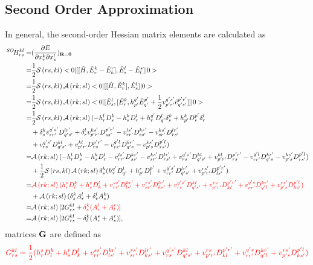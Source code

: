 \documentclass[a4paper,12pt,oneside]{book}
\newcommand{\red}[1]{{\color{red} #1}}
\newcommand{\Sop}[2]{{\cal S}\left(#1,#2\right)}
\newcommand{\ASop}[2]{{\cal A}\left(#1;#2\right)}
\newcommand{\pre}[1]{\,#1\!}
\begin{document}
\subsection{Second Order Approximation}
In general, the second-order Hessian matrix elements are calculated as
\begin{equation}
\begin{aligned}
  \pre{^{SO}}H_{rs}^{kl} =&  (\frac{\partial E}{\partial x_r^k\partial x_s^l})_{\bf{R = \bf{0}}}\\
  =& \frac{1}{2}\Sop{rs}{kl} <0|[[\hat{H},\hat{E}^k_r-\hat{E}^r_k],\hat{E}^l_s-\hat{E}^s_l]|0>\\
  =& \frac{1}{2}\Sop{rs}{kl} \ASop{rk}{sl} <0|[[\hat{H},\hat{E}^k_r], \hat{E}^l_s]|0>\\
  =& \frac{1}{2}\Sop{rs}{kl} \ASop{rk}{sl} <0|[\hat{E}^l_s,[\hat{E}^k_r, h^{q'}_{p'}\hat{E}^{p'}_{q'} + \frac{1}{2}v^{q's'}_{p'r'}\hat{e}^{p'r'}_{q's'}]]|0>\\
  =& \frac{1}{2}\Sop{rs}{kl} \ASop{rk}{sl} (-h^l_rD^k_s -h^k_sD^l_r + h^{q'}_rD^l_{q'}\delta^k_s + h^k_{p'}D^{p'}_s\delta^l_r\\
  &+\delta^k_sv^{q's'}_{rr'}D^{lr'}_{q's'} + \delta^l_r v^{ks'}_{p'r'}D^{p'r'}_{ss'}-v^{ls'}_{rr'}D^{kr'}_{ss'} - v^{ks'}_{sr'}D^{lr'}_{rs'}\\
  &+v^{q's'}_{rs}D^{kl}_{q's'} + v^{kl}_{p'r'}D^{p'r'}_{rs} - v^{q'l}_{rr'}D^{kr'}_{q's} - v^{ks'}_{p's}D^{p'l}_{rs'})\\
  =& \ASop{rk}{sl} (-h^l_rD^k_s - h^k_sD^l_r -v^{ls'}_{rr'}D^{kr'}_{ss'} - v^{ks'}_{sr'}D^{lr'}_{rs'} +v^{q's'}_{rs}D^{kl}_{q's'} + v^{kl}_{p'r'}D^{p'r'}_{rs} - v^{q'l}_{rr'}D^{kr'}_{q's} - v^{ks'}_{p's}D^{p'l}_{rs'} )\\
   &+ \frac{1}{2} \Sop{rs}{kl} \ASop{rk}{sl} \delta^k_s(h^{q'}_rD^l_{q'} + h^r_{p'}D^{p'}_l +v^{q's'}_{rr'} D^{lr'}_{q's'}+ v^{rs'}_{p'r'}D^{p'r'}_{ls'} ) \\
  =&\red{ \ASop{rk}{sl} (h^s_rD^k_l + h^r_s D^l_k + v^{ss'}_{rr'}D^{kr'}_{ls'} + v^{rs'}_{sr'}D^{lr'}_{ks'} + v^{q's'}_{rs}D^{kl}_{q's'} + v^{rs}_{p'r'}D^{p'r'}_{kl} + v^{q's}_{rr'}D^{kr'}_{q'l}+  v^{rs'}_{p's}D^{p'l}_{ks'}) }\\
   &+ \ASop{rk}{sl}(\delta^k_sA^l_r+\delta^l_rA^k_s)\\
  =& \ASop{rk}{sl} [2G^{kl}_{rs}+ \red{\delta^k_s(A^l_r+A^r_l)}]\\
  =& \ASop{rk}{sl} [2G^{kl}_{rs}-\delta^k_l(A_r^s+A_s^r)],\\
\end{aligned}
\end{equation}
matrices $\bf{G}$ are defined as
\begin{equation}
  \red{G^{kl}_{rs} = \frac{1}{2} (h^s_rD^k_l + h^r_s D^l_k + v^{ss'}_{rr'}D^{kr'}_{ls'} + v^{rs'}_{sr'}D^{lr'}_{ks'} + v^{q's'}_{rs}D^{kl}_{q's'} + v^{rs}_{p'r'}D^{p'r'}_{kl} + v^{q's}_{rr'}D^{kr'}_{q'l}+  v^{rs'}_{p's}D^{p'l}_{ks'})}
\end{equation}
\end{document}
